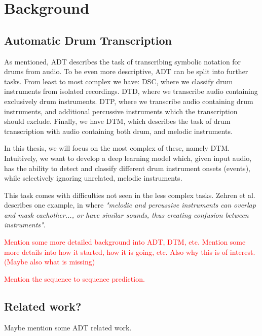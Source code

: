 \chapter{Background}

\section{Automatic Drum Transcription}

As mentioned, \gls{ADT} describes the task of transcribing symbolic notation for drums from audio. To be even more descriptive, \gls{ADT} can be split into further tasks. From least to most complex we have: \gls{DSC}, where we classify drum instruments from isolated recordings. \gls{DTD}, where we transcribe audio containing exclusively drum instruments. \gls{DTP}, where we transcribe audio containing drum instruments, and additional percussive instruments which the transcription should exclude. Finally, we have \gls{DTM}, which describes the task of drum transcription with audio containing both drum, and melodic instruments.~\cite{8350302}

In this thesis, we will focus on the most complex of these, namely \gls{DTM}. Intuitively, we want to develop a deep learning model which, given input audio, has the ability to detect and classify different drum instrument onsets (events), while selectively ignoring unrelated, melodic instruments.

This task comes with difficulties not seen in the less complex tasks. Zehren et al.\cite{signals4040042} describes one example, in where \textit{"melodic and percussive instruments can overlap and mask eachother..., or have similar sounds, thus creating confusion between instruments"}.

\textcolor{red}{
Mention some more detailed background into \gls{ADT}, \gls{DTM}, etc.
Mention some more details into how it started, how it is going, etc.
Also why this is of interest. (Maybe also what is missing)
}

\textcolor{red}{
Mention the sequence to sequence prediction.
}

\section{Related work?}

Maybe mention some \gls{ADT} related work.